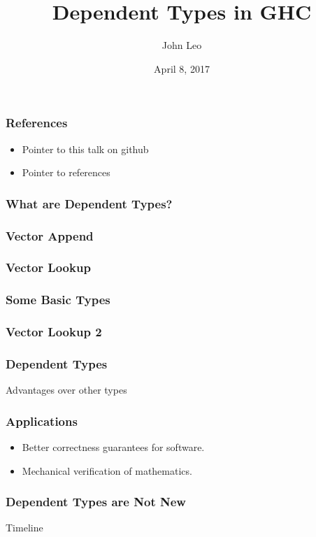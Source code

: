 \documentclass{beamer}
\title{Dependent Types in GHC}
\author{John Leo}
\institute{Halfaya Research}
\date{April 8, 2017}
\begin{document}
 
\frame{\titlepage}
 
\begin{frame}\frametitle{References}
\begin{itemize}
\item Pointer to this talk on github
\item Pointer to references
\end{itemize}
\end{frame}

\begin{frame}\frametitle{What are Dependent Types?}
\end{frame}

\begin{frame}\frametitle{Vector Append}
\end{frame}

\begin{frame}\frametitle{Vector Lookup}
\end{frame}

\begin{frame}\frametitle{Some Basic Types}
\end{frame}

\begin{frame}\frametitle{Vector Lookup 2}
\end{frame}

\begin{frame}\frametitle{Dependent Types}
Advantages over other types  
\end{frame}

\begin{frame}\frametitle{Applications}
\begin{itemize}
\item Better correctness guarantees for software.
\item Mechanical verification of mathematics.
\end{itemize}
\end{frame}

\begin{frame}\frametitle{Dependent Types are Not New}
Timeline  
\end{frame}
\end{document}
